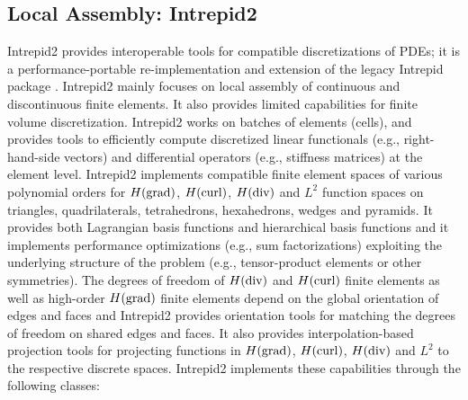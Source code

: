 \subsection{Local Assembly: Intrepid2}
Intrepid2 provides interoperable tools for compatible discretizations of PDEs; it is a performance-portable re-implementation and extension of the legacy Intrepid package \cite{bochev2012}. Intrepid2 mainly focuses on local assembly of continuous and discontinuous finite elements. It also provides limited capabilities for finite volume discretization.  Intrepid2 works on batches of elements (cells), and provides tools to efficiently compute discretized linear functionals (e.g., right-hand-side vectors) and differential operators (e.g., stiffness matrices) at the element level. Intrepid2 implements compatible finite element spaces of various polynomial orders for $H({\rm grad})$, $H({\rm curl})$, $H({\rm div})$ and $L^2$ function spaces on triangles, quadrilaterals, tetrahedrons, hexahedrons, wedges and pyramids. It provides both Lagrangian basis functions and hierarchical basis functions \cite{fuentes2015} and it implements performance optimizations (e.g., sum factorizations) exploiting the underlying structure of the problem (e.g., tensor-product elements or other symmetries).  The degrees of freedom of $H({\rm div})$ and $H({\rm curl})$ finite elements as well as high-order $H({\rm grad})$ finite elements depend on the global orientation of edges and faces and Intrepid2 provides orientation tools for matching the degrees of freedom on shared edges and faces. It also provides interpolation-based projection tools for projecting functions in $H({\rm grad})$, $H({\rm curl})$, $H({\rm div})$ and $L^2$ to the respective discrete spaces. Intrepid2 implements these capabilities through the following classes:
